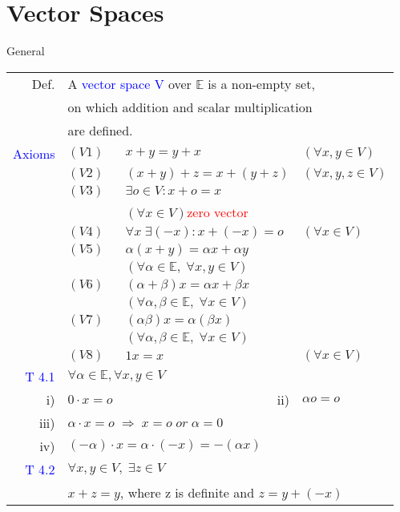 \section{Vector Spaces}
\begin{mainbox}{General}
\setlength{\tabcolsep}{2pt}
\begin{tabular}{rlll}
	Def. & \multicolumn{3}{l}{A \textcolor{blue}{vector space V} over $\mathbb{E}$ is a non-empty set,}\\
	& \multicolumn{3}{l}{on which addition and scalar multiplication}\\
	& \multicolumn{3}{l}{are defined.}\\
	\rule{0pt}{3ex} 
	\textcolor{blue}{Axioms} & $(V1)$ & $x+y=y+x$ & $(\forall x,y \in V)$\\
	& $(V2)$ & $(x+y)+z=x+(y+z)$ & $(\forall x,y,z \in V)$\\
	& $(V3)$ & \multicolumn{2}{l}{$\exists o\in V: x + o = x$}\\
	& & \multicolumn{2}{l}{$(\forall x \in V)$\quad\textcolor{red}{zero vector}}\\
	& $(V4)$ & $\forall x\;\exists (-x): x+(-x) = o$ & $(\forall x \in V)$\\
	& $(V5)$ & \multicolumn{2}{l}{$\alpha(x+y)=\alpha x+\alpha y$}\\
	& & \multicolumn{2}{l}{$(\forall \alpha \in \mathbb{E},\; \forall x,y \in V)$}\\
	& $(V6)$ & \multicolumn{2}{l}{$(\alpha+\beta)x=\alpha x+\beta x$}\\
	& & \multicolumn{2}{l}{$(\forall \alpha, \beta \in \mathbb{E},\;\forall x \in V)$}\\
	& $(V7)$ & \multicolumn{2}{l}{$(\alpha \beta)x = \alpha (\beta x)$}\\
	& & \multicolumn{2}{l}{$(\forall \alpha, \beta \in \mathbb{E},\;\forall x \in V)$}\\
	& $(V8)$ & $1x = x$ & $(\forall x \in V)$\\
	\rule{0pt}{3ex}
	\textcolor{blue}{T 4.1} & \multicolumn{3}{l}{$\forall \alpha \in \mathbb{E}, \forall x,y \in V$}\\
	\multicolumn{1}{r}{i)} & \multicolumn{1}{l}{$0\cdot x = o$} & \multicolumn{1}{r}{ii)} & \multicolumn{1}{l}{$\alpha o = o$}\\
	\multicolumn{1}{r}{iii)} & \multicolumn{3}{l}{$\alpha \cdot x = o\;\Rightarrow\;x=o\;or\;\alpha = 0$}\\
	\multicolumn{1}{r}{iv)} & \multicolumn{3}{l}{$(-\alpha)\cdot x = \alpha \cdot (-x) = -(\alpha x)$}\\
	\rule{0pt}{3ex}
	\textcolor{blue}{T 4.2} & \multicolumn{3}{l}{$\forall x,y \in V,\;\exists z \in V$}\\
	& \multicolumn{3}{l}{$x + z = y$, where z is definite and $z = y + (-x)$}\\
\end{tabular}
\end{mainbox}

